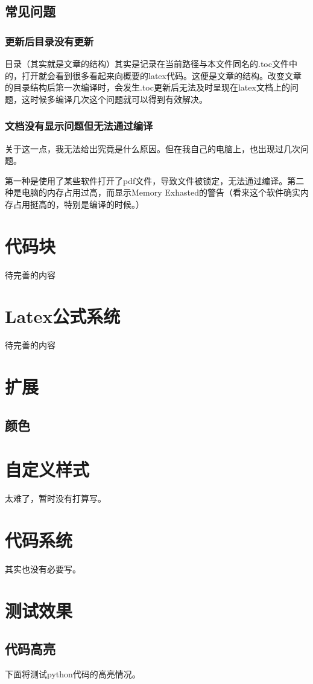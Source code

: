 \documentclass{article}
\begin{document}
        \subsection{常见问题}
            \hypertarget{norefresh-toc}{}
            \subsubsection{更新后目录没有更新}
                目录（其实就是文章的结构）其实是记录在当前路径与本文件同名的.toc文件中的，打开就会看到很多看起来向概要的latex代码。这便是文章的结构。改变文章的目录结构后第一次编译时，会发生.toc更新后无法及时呈现在latex文档上的问题，这时候多编译几次这个问题就可以得到有效解决。
            \subsubsection{文档没有显示问题但无法通过编译}
                关于这一点，我无法给出究竟是什么原因。但在我自己的电脑上，也出现过几次问题。

                第一种是使用了某些软件打开了pdf文件，导致文件被锁定，无法通过编译。第二种是电脑的内存占用过高，而显示Memory Exhasted的警告（看来这个软件确实内存占用挺高的，特别是编译的时候。）
    \section{代码块}
        待完善的内容
    \section{Latex公式系统}
        待完善的内容
    \section{扩展}
        \subsection{颜色}
    \section{自定义样式}
        太难了，暂时没有打算写。
    \section{代码系统}
        其实也没有必要写。
    \section{测试效果}
        \subsection{代码高亮}
            下面将测试python代码的高亮情况。

            
\end{document}
